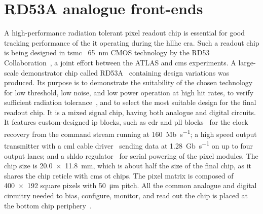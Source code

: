 \section{RD53A analogue front-ends}
\label{sec:pixelchip}

A high-performance radiation tolerant pixel readout chip is essential for good tracking performance of the \gls{it} operating during the \gls{hllhc} era. Such a readout chip is being designed in \acrshort{tsmc}~\cite{tsmc_web} \SI{65}{\nano\meter} CMOS technology by the RD53 Collaboration~\citep{rd53}, a joint effort between the ATLAS and \gls{cms} experiments.
A large-scale demonstrator chip called RD53A~\citep{rd53a_manual} containing design variations was produced. Its purpose is to demonstrate the suitability of the chosen technology for low threshold, low noise, and low power operation at high hit rates, to verify sufficient radiation tolerance~\citep{rd53a_specs}, and to select the most suitable design for the final readout chip.
It is a mixed signal chip, having both analogue and digital circuits. It features custom-designed \acrlong{ip} blocks, such as \acrlong{cdr} and \acrlong{pll} blocks~\citep{rd53a_cdr} for the clock recovery from the command stream running at \SI{160}{\mega b\per\second}; a high speed output transmitter with a \acrlong{cml} cable driver~\citep{rd53a_transmitter} sending data at \SI{1.28}{\giga b\per\second} on up to four output lanes; and a \acrlong{shldo} regulator~\citep{shldo} for serial powering of the pixel modules.
The chip size is \SI[product-units = power]{20.0 x 11.8}{\milli\meter}, which is about half the size of the final chip, as it shares the chip reticle with \gls{cms} \acrlong{ot} chips. The pixel matrix is composed of \num{400 x 192} square pixels with \SI{50}{\micro\metre} pitch. 
All the common analogue and digital circuitry needed to bias, configure, monitor, and read out the chip is placed at the bottom chip periphery~\citep{rd53a_manual}.

